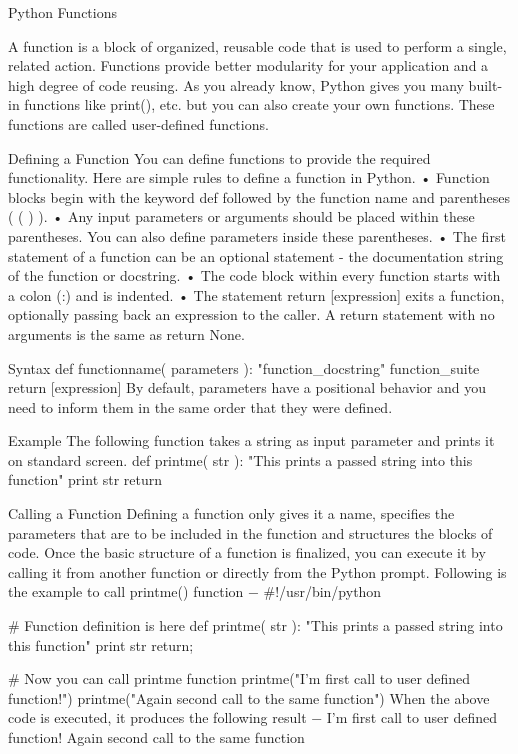 Python Functions

A function is a block of organized, reusable code that is used to perform a single, related action. Functions provide better modularity for your application and a high degree of code reusing.
As you already know, Python gives you many built-in functions like print(), etc. but you can also create your own functions. These functions are called user-defined functions.

Defining a Function
You can define functions to provide the required functionality. Here are simple rules to define a function in Python.
•	Function blocks begin with the keyword def followed by the function name and parentheses ( ( ) ).
•	Any input parameters or arguments should be placed within these parentheses. You can also define parameters inside these parentheses.
•	The first statement of a function can be an optional statement - the documentation string of the function or docstring.
•	The code block within every function starts with a colon (:) and is indented.
•	The statement return [expression] exits a function, optionally passing back an expression to the caller. A return statement with no arguments is the same as return None.


Syntax
	def functionname( parameters ):
   		"function_docstring"
   		function_suite
   		return [expression]
By default, parameters have a positional behavior and you need to inform them in the same order that they were defined.

Example
The following function takes a string as input parameter and prints it on standard screen.
	def printme( str ):
   		"This prints a passed string into this function"
   		print str
   		return

Calling a Function
Defining a function only gives it a name, specifies the parameters that are to be included in the function and structures the blocks of code.
Once the basic structure of a function is finalized, you can execute it by calling it from another function or directly from the Python prompt. Following is the example to call printme() function −
	#!/usr/bin/python

	# Function definition is here
	def printme( str ):
   		"This prints a passed string into this function"
   	print str
   	return;

	# Now you can call printme function
	printme("I'm first call to user defined function!")
	printme("Again second call to the same function")
When the above code is executed, it produces the following result −
	I'm first call to user defined function!
	Again second call to the same function

